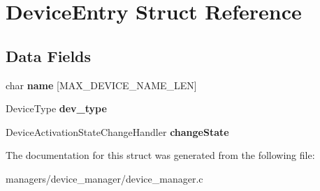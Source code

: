 \hypertarget{structDeviceEntry}{}\section{Device\+Entry Struct Reference}
\label{structDeviceEntry}
\subsection*{Data Fields}
\begin{DoxyCompactItemize}
\item 
char {\bfseries name} \mbox{[}M\+A\+X\+\_\+\+D\+E\+V\+I\+C\+E\+\_\+\+N\+A\+M\+E\+\_\+\+L\+EN\mbox{]}\hypertarget{structDeviceEntry_ad81a5083b6f05a3bcdb707c8b672f8c1}{}\label{structDeviceEntry_ad81a5083b6f05a3bcdb707c8b672f8c1}

\item 
Device\+Type {\bfseries dev\+\_\+type}\hypertarget{structDeviceEntry_a79285a7dc2e69221cc1788c0f546c999}{}\label{structDeviceEntry_a79285a7dc2e69221cc1788c0f546c999}

\item 
Device\+Activation\+State\+Change\+Handler {\bfseries change\+State}\hypertarget{structDeviceEntry_aa8b473ef2c63d5aee362f620633638aa}{}\label{structDeviceEntry_aa8b473ef2c63d5aee362f620633638aa}

\end{DoxyCompactItemize}


The documentation for this struct was generated from the following file\+:\begin{DoxyCompactItemize}
\item 
managers/device\+\_\+manager/device\+\_\+manager.\+c\end{DoxyCompactItemize}
